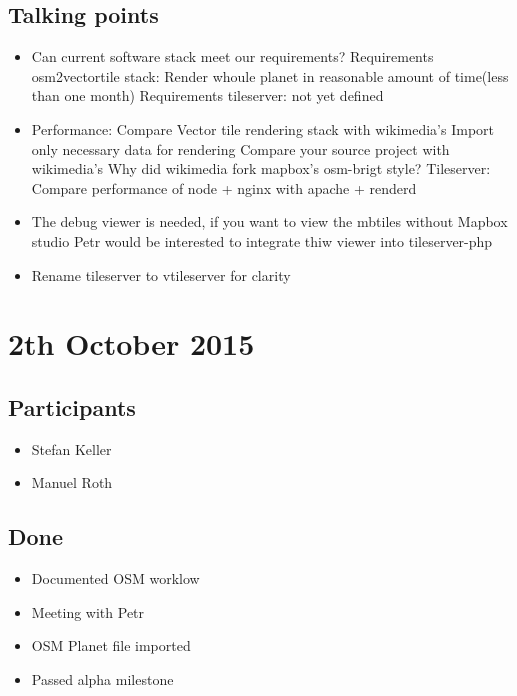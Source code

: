 \subsection*{Talking points}

\begin{itemize}
  \item Can current software stack meet our requirements?
  \subitem Requirements osm2vectortile stack: Render whoule planet in reasonable amount of time(less than one month)
  \subitem Requirements tileserver: not yet defined
  \item Performance:
  \subitem Compare Vector tile rendering stack with wikimedia's
  \subsubitem Import only necessary data for rendering
  \subsubitem Compare your source project with wikimedia's
  \subsubitem Why did wikimedia fork mapbox's osm-brigt style?
  \subitem Tileserver: Compare performance of node + nginx with apache + renderd
  \item The debug viewer is needed, if you want to view the mbtiles without Mapbox studio
  \subitem Petr would be interested to integrate thiw viewer into tileserver-php
  \item Rename tileserver to vtileserver for clarity
\end{itemize}

\section*{2th October 2015}

\subsection*{Participants}

\begin{itemize}
  \item Stefan Keller
  \item Manuel Roth
\end{itemize}


\subsection*{Done}

\begin{itemize}
  \item Documented OSM worklow
  \item Meeting with Petr
  \item OSM Planet file imported
  \item Passed alpha milestone
\end{itemize}

